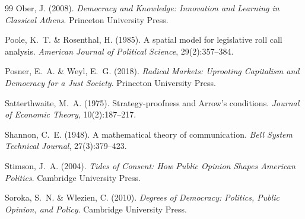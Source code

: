 \documentclass[twocolumn,10pt]{article}
\begin{document}
\begin{thebibliography}{99}
Ober, J. (2008).
\newblock \emph{Democracy and Knowledge: Innovation and Learning in Classical Athens}.
\newblock Princeton University Press.

Poole, K.~T. \& Rosenthal, H. (1985).
\newblock A spatial model for legislative roll call analysis.
\newblock \emph{American Journal of Political Science}, 29(2):357--384.

Posner, E.~A. \& Weyl, E.~G. (2018).
\newblock \emph{Radical Markets: Uprooting Capitalism and Democracy for a Just Society}.
\newblock Princeton University Press.

Satterthwaite, M.~A. (1975).
\newblock Strategy-proofness and {A}rrow's conditions.
\newblock \emph{Journal of Economic Theory}, 10(2):187--217.

Shannon, C.~E. (1948).
\newblock A mathematical theory of communication.
\newblock \emph{Bell System Technical Journal}, 27(3):379--423.

Stimson, J.~A. (2004).
\newblock \emph{Tides of Consent: How Public Opinion Shapes American Politics}.
\newblock Cambridge University Press.

Soroka, S.~N. \& Wlezien, C. (2010).
\newblock \emph{Degrees of Democracy: Politics, Public Opinion, and Policy}.
\newblock Cambridge University Press.

\end{thebibliography}
\end{document}
